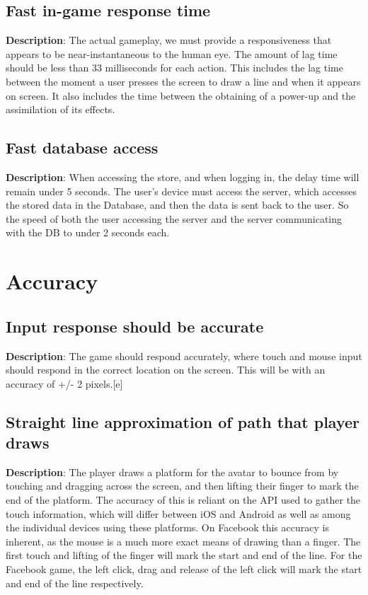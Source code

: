 \subsection{Fast in-game response time}
\textbf{Description}: The actual gameplay, we must provide a responsiveness
that appears to be near-instantaneous to the human eye. The amount of lag time
should be less than 33 milliseconds for each action. This includes
the lag time between the moment a user presses the screen to draw
a line and when it appears on screen. It also includes the time between
the obtaining of a power-up and the assimilation of its effects.

\subsection{Fast database access}
\textbf{Description}: When accessing the store, and when logging in, the delay
time will remain under 5 seconds. The user\textquoteright{}s device
must access the server, which accesses the stored data in the Database,
and then the data is sent back to the user. So the speed of both the
user accessing the server and the server communicating with the DB
to under 2 seconds each.

\section{Accuracy}
\renewcommand\thesubsection{ACC-%
\ifnum\value{subsection}<10 0\fi
\arabic{subsection}}
\subsection{Input response should be accurate}
\textbf{Description}: The game should respond accurately, where touch and mouse
input should respond in the correct location on the screen. This will
be with an accuracy of +/- 2 pixels.{[}e{]}

\subsection{Straight line approximation of path that player draws}
\textbf{Description}: The player draws a platform for the avatar to bounce
from by touching and dragging across the screen, and then lifting
their finger to mark the end of the platform. The accuracy of this
is reliant on the API used to gather the touch information, which
will differ between iOS and Android as well as among the individual
devices using these platforms. On Facebook this accuracy is inherent,
as the mouse is a much more exact means of drawing than a finger.
The first touch and lifting of the finger will mark the start and
end of the line. For the Facebook game, the left click, drag and release
of the left click will mark the start and end of the line respectively.

